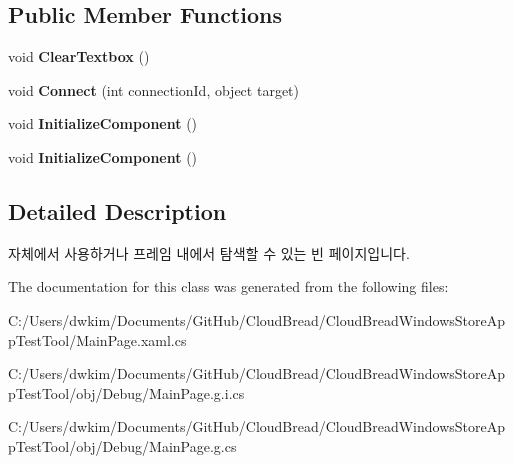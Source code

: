\subsection*{Public Member Functions}
\begin{DoxyCompactItemize}
\item 
void {\bfseries Clear\+Textbox} ()\hypertarget{class_cloud_bread_windows_store_app_test_tool_1_1_main_page_a6a677940306a5b433c5d1affe2a67a64}{}\label{class_cloud_bread_windows_store_app_test_tool_1_1_main_page_a6a677940306a5b433c5d1affe2a67a64}

\item 
void {\bfseries Connect} (int connection\+Id, object target)\hypertarget{class_cloud_bread_windows_store_app_test_tool_1_1_main_page_a0cc0c40694564a77f1fa4d0643d3c3b7}{}\label{class_cloud_bread_windows_store_app_test_tool_1_1_main_page_a0cc0c40694564a77f1fa4d0643d3c3b7}

\item 
void {\bfseries Initialize\+Component} ()\hypertarget{class_cloud_bread_windows_store_app_test_tool_1_1_main_page_a0dc19ae72b15d40001334811c71552a4}{}\label{class_cloud_bread_windows_store_app_test_tool_1_1_main_page_a0dc19ae72b15d40001334811c71552a4}

\item 
void {\bfseries Initialize\+Component} ()\hypertarget{class_cloud_bread_windows_store_app_test_tool_1_1_main_page_a0dc19ae72b15d40001334811c71552a4}{}\label{class_cloud_bread_windows_store_app_test_tool_1_1_main_page_a0dc19ae72b15d40001334811c71552a4}

\end{DoxyCompactItemize}


\subsection{Detailed Description}
자체에서 사용하거나 프레임 내에서 탐색할 수 있는 빈 페이지입니다. 



The documentation for this class was generated from the following files\+:\begin{DoxyCompactItemize}
\item 
C\+:/\+Users/dwkim/\+Documents/\+Git\+Hub/\+Cloud\+Bread/\+Cloud\+Bread\+Windows\+Store\+App\+Test\+Tool/Main\+Page.\+xaml.\+cs\item 
C\+:/\+Users/dwkim/\+Documents/\+Git\+Hub/\+Cloud\+Bread/\+Cloud\+Bread\+Windows\+Store\+App\+Test\+Tool/obj/\+Debug/Main\+Page.\+g.\+i.\+cs\item 
C\+:/\+Users/dwkim/\+Documents/\+Git\+Hub/\+Cloud\+Bread/\+Cloud\+Bread\+Windows\+Store\+App\+Test\+Tool/obj/\+Debug/Main\+Page.\+g.\+cs\end{DoxyCompactItemize}
